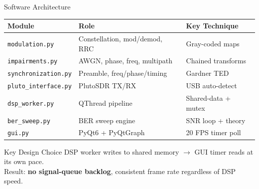 \documentclass[aspectratio=169, 12pt]{beamer}
\begin{document}
\begin{frame}{Software Architecture}
\begin{center}
\small
\begin{tabular}{l l l}
\toprule
\textbf{Module} & \textbf{Role} & \textbf{Key Technique} \\
\midrule
\texttt{modulation.py}       & Constellation, mod/demod, RRC    & Gray-coded maps \\
\texttt{impairments.py}      & AWGN, phase, freq, multipath     & Chained transforms \\
\texttt{synchronization.py}  & Preamble, freq/phase/timing      & Gardner TED \\
\texttt{pluto\_interface.py} & PlutoSDR TX/RX                   & USB auto-detect \\
\texttt{dsp\_worker.py}      & QThread pipeline                 & Shared-data + mutex \\
\texttt{ber\_sweep.py}       & BER sweep engine                 & SNR loop + theory \\
\texttt{gui.py}              & PyQt6 + PyQtGraph                & 20 FPS timer poll \\
\bottomrule
\end{tabular}
\end{center}
\vspace{0.4cm}
\begin{block}{Key Design Choice}
DSP worker writes to shared memory $\to$ GUI timer reads at its own pace.\\
Result: \textbf{no signal-queue backlog}, consistent frame rate regardless of DSP speed.
\end{block}
\end{frame}
\end{document}
